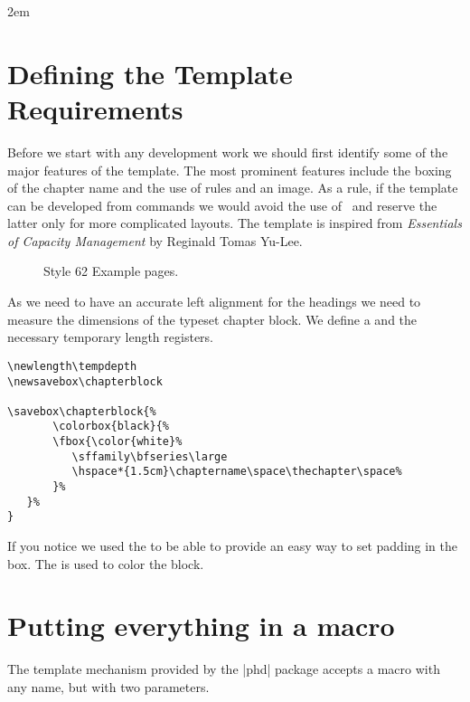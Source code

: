 \parindent2em
\section{Defining the Template Requirements}

Before we start with any development work we should first identify some of the major features of the template. The most prominent features include the boxing of the chapter name and the use of rules and an image. As a rule, if the template can be developed from \tex commands we would avoid the use of \tikzname\ and reserve the latter only for more complicated layouts. The template is inspired from \emph{Essentials of Capacity Management}
by Reginald Tomas Yu-Lee. 

\begin{figure}[ht]
\centering
{}
\caption{Style 62 Example pages.}
\end{figure}

As we need to have an accurate left alignment for the headings we need to measure the dimensions of the 
typeset chapter block. We define a \cmd{\newsavebox} and the necessary temporary length registers.

\begin{scriptexample}{}{}
\begin{verbatim}
\newlength\tempdepth
\newsavebox\chapterblock

\savebox\chapterblock{%
       \colorbox{black}{%
       \fbox{\color{white}% 
          \sffamily\bfseries\large
          \hspace*{1.5cm}\chaptername\space\thechapter\space%
       }%
   }%
}
\end{verbatim}
\end{scriptexample}

If you notice we used the \cmd{\fbox}  to be able to provide an easy way to set padding in the box. The
 is used to color the block. 

\section{Putting everything in a macro}

The template mechanism provided by the |phd| package accepts a macro with any name, but with two parameters.

